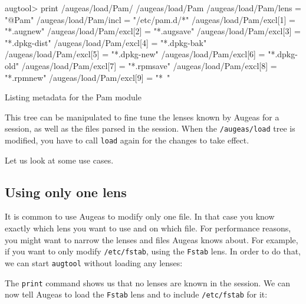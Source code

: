 \begin{listing}
  \begin{augtoolsh}[]
augtool> print /augeas/load/Pam/
/augeas/load/Pam
/augeas/load/Pam/lens = "@Pam"
/augeas/load/Pam/incl = "/etc/pam.d/*"
/augeas/load/Pam/excl[1] = "*.augnew"
/augeas/load/Pam/excl[2] = "*.augsave"
/augeas/load/Pam/excl[3] = "*.dpkg-dist"
/augeas/load/Pam/excl[4] = "*.dpkg-bak"
/augeas/load/Pam/excl[5] = "*.dpkg-new"
/augeas/load/Pam/excl[6] = "*.dpkg-old"
/augeas/load/Pam/excl[7] = "*.rpmsave"
/augeas/load/Pam/excl[8] = "*.rpmnew"
/augeas/load/Pam/excl[9] = "*~"
  \end{augtoolsh}
  \caption{Listing metadata for the Pam module}
  \label{lst:metadata_load_pam}
\end{listing}


This tree can be manipulated to fine tune the lenses known by Augeas for a session, as well as the files parsed in the session. When the \nolinkurl{/augeas/load} tree is modified, you have to call \verb!load! again for the changes to take effect.

Let us look at some use cases.

\subsection{Using only one lens}

It is common to use Augeas to modify only one file. In that case you know exactly which lens you want to use and on which file. For performance reasons, you might want to narrow the lenses and files Augeas knows about. For example, if you want to only modify \nolinkurl{/etc/fstab}, using the \verb!Fstab! lens. In order to do that, we can start \verb!augtool! without loading any lenses:





\begin{quote}

\end{quote}
The \verb!print! command shows us that no lenses are known in the session. We can now tell Augeas to load the \verb!Fstab! lens and to include \nolinkurl{/etc/fstab} for it:

